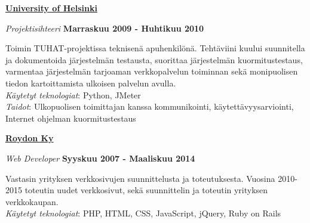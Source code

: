 \documentclass[10pt,finnish,a4paper]{article}
\newenvironment{outerlist}[1][\enskip\textbullet]%
        {\begin{itemize}[#1]}{\end{itemize}%
         \vspace{-.6\baselineskip}}
\newenvironment{innerlist}[1][\enskip\textbullet]%
        {\begin{compactitem}[#1]}{\end{compactitem}}
\newcommand{\blankline}{\quad\pagebreak[2]}
\begin{document}
\href{http://www.helsinki.fi/university/index.html}{\textbf{University of Helsinki}}
\begin{outerlist}

\item[] \textit{Projektisihteeri}%
    \hfill \textbf{Marraskuu 2009 - Huhtikuu 2010}
    \begin{innerlist}
        \item Toimin TUHAT-projektissa teknisenä apuhenkilönä. Tehtäviini kuului suunnitella ja dokumentoida järjestelmän testausta, suorittaa järjestelmän kuormitustestaus, varmentaa järjestelmän tarjoaman verkkopalvelun toiminnan sekä monipuolisen tiedon kartoittamista ulkoisen palvelun avulla.\\

        \emph{Käytetyt teknologiat}: Python, JMeter\\
        \emph{Taidot}: Ulkopuolisen toimittajan kanssa kommunikointi, käytettävyysarviointi, Internet ohjelman kuormitustestaus
    \end{innerlist}
\end{outerlist}
\blankline

\href{http://roydon.fi}{\textbf{Roydon Ky}}
\begin{outerlist}

\item[] \textit{Web Developer}%
    \hfill \textbf{Syyskuu 2007 - Maaliskuu 2014}
    \begin{innerlist}
        \item Vastasin yrityksen verkkosivujen suunnittelusta ja toteutuksesta. Vuosina 2010-2015 toteutin uudet verkkosivut, sekä suunnittelin ja toteutin yrityksen verkkokaupan.\\

        \emph{Käytetyt teknologiat}: PHP, HTML, CSS, JavaScript, jQuery, Ruby on Rails\\
    \end{innerlist}
\end{outerlist}
\blankline

\clearpage
\end{document}
